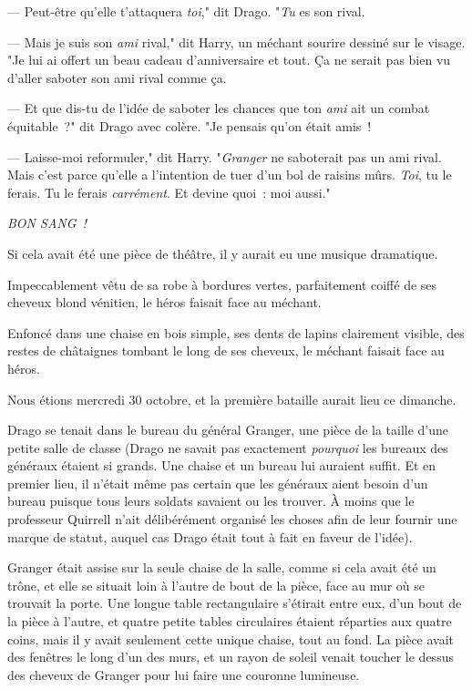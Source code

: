 --- Peut-être qu'elle t'attaquera \emph{toi}," dit Drago. "\emph{Tu} es son rival.

--- Mais je suis son \emph{ami} rival," dit Harry, un méchant sourire dessiné sur le visage. "Je lui ai offert un beau cadeau d'anniversaire et tout. Ça ne serait pas bien vu d'aller saboter son ami rival comme ça.

--- Et que dis-tu de l'idée de saboter les chances que ton \emph{ami} ait un combat équitable~?" dit Drago avec colère. "Je pensais qu'on était amis~!

--- Laisse-moi reformuler," dit Harry. "\emph{Granger} ne saboterait pas un ami rival. Mais c'est parce qu'elle a l'intention de tuer d'un bol de raisins mûrs. \emph{Toi}, tu le ferais. Tu le ferais \emph{carrément}. Et devine quoi~: moi aussi."

\emph{BON SANG~!}

\later

Si cela avait été une pièce de théâtre, il y aurait eu une musique dramatique.

Impeccablement vêtu de sa robe à bordures vertes, parfaitement coiffé de ses cheveux blond vénitien, le héros faisait face au méchant.

Enfoncé dans une chaise en bois simple, ses dents de lapins clairement visible, des restes de châtaignes tombant le long de ses cheveux, le méchant faisait face au héros.

Nous étions mercredi 30 octobre, et la première bataille aurait lieu ce dimanche.

Drago se tenait dans le bureau du général Granger, une pièce de la taille d'une petite salle de classe (Drago ne savait pas exactement \emph{pourquoi} les bureaux des généraux étaient si grands. Une chaise et un bureau lui auraient suffit. Et en premier lieu, il n'était même pas certain que les généraux aient besoin d'un bureau puisque tous leurs soldats savaient ou les trouver. À moins que le professeur Quirrell n'ait délibérément organisé les choses afin de leur fournir une marque de statut, auquel cas Drago était tout à fait en faveur de l'idée).

Granger était assise sur la seule chaise de la salle, comme si cela avait été un trône, et elle se situait loin à l'autre de bout de la pièce, face au mur où se trouvait la porte. Une longue table rectangulaire s'étirait entre eux, d'un bout de la pièce à l'autre, et quatre petite tables circulaires étaient réparties aux quatre coins, mais il y avait seulement cette unique chaise, tout au fond. La pièce avait des fenêtres le long d'un des murs, et un rayon de soleil venait toucher le dessus des cheveux de Granger pour lui faire une couronne lumineuse.

